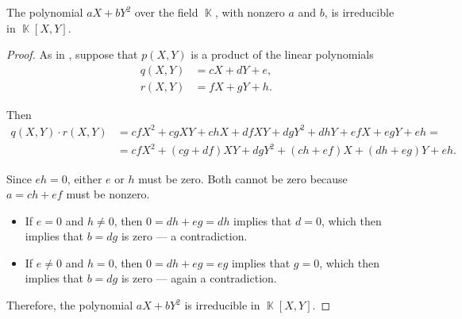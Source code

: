 \begin{lemma}\label{thm:y2_minus_x_irreducible}
  The polynomial \( a X + b Y^2 \) over the field \( \BbbK \), with nonzero \( a \) and \( b \), is irreducible in \( \BbbK[X, Y] \).
\end{lemma}
\begin{proof}
  As in , suppose that \( p(X, Y) \) is a product of the linear polynomials
  \begin{align*}
    q(X, Y) &= c X + d Y + e, \\
    r(X, Y) &= f X + g Y + h.
  \end{align*}

  Then
  \begin{align*}
    q(X, Y) \cdot r(X, Y)
    &=
    cf X^2 + cg XY + ch X + df XY + dg Y^2 + dh Y + ef X + eg Y + eh
    = \\ &=
    cf X^2 + (cg + df) XY + dg Y^2 + (ch + ef) X + (dh + eg) Y + eh.
  \end{align*}

  Since \( eh = 0 \), either \( e \) or \( h \) must be zero. Both cannot be zero because \( a = ch + ef \) must be nonzero.
  \begin{itemize}
    \item If \( e = 0 \) and \( h \neq 0 \), then \( 0 = dh + eg = dh \) implies that \( d = 0 \), which then implies that \( b = dg \) is zero --- a contradiction.

    \item If \( e \neq 0 \) and \( h = 0 \), then \( 0 = dh + eg = eg \) implies that \( g = 0 \), which then implies that \( b = dg \) is zero --- again a contradiction.
  \end{itemize}

  Therefore, the polynomial \( a X + b Y^2 \) is irreducible in \( \BbbK[X, Y] \).
\end{proof}

